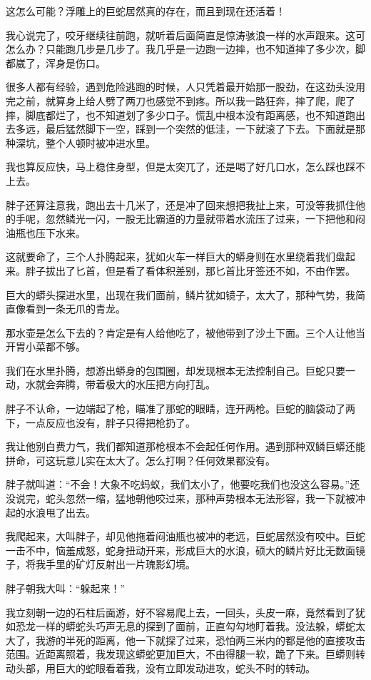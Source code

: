 这怎么可能？浮雕上的巨蛇居然真的存在，而且到现在还活着！

我心说完了，咬牙继续往前跑，就听着后面简直是惊涛骇浪一样的水声跟来。这可怎么办？只能跑几步是几步了。我几乎是一边跑一边摔，也不知道摔了多少次，脚都崴了，浑身是伤口。

很多人都有经验，遇到危险逃跑的时候，人只凭着最开始那一股劲，在这劲头没用完之前，就算身上给人劈了两刀也感觉不到疼。所以我一路狂奔，摔了爬，爬了摔，脚底都烂了，也不知道划了多少口子。慌乱中根本没有距离感，也不知道跑出去多远，最后猛然脚下一空，踩到一个突然的低洼，一下就滚了下去。下面就是那种深坑，整个人顿时被冲进水里。

我也算反应快，马上稳住身型，但是太突兀了，还是喝了好几口水，怎么踩也踩不上去。

胖子还算注意我，跑出去十几米了，还是冲了回来想把我扯上来，可没等我抓住他的手呢，忽然鳞光一闪，一股无比霸道的力量就带着水流压了过来，一下把他和闷油瓶也压下水来。

这就要命了，三个人扑腾起来，犹如火车一样巨大的蟒身则在水里绕着我们盘起来。胖子拔出了匕首，但是看了看体积差别，那匕首比牙签还不如，不由作罢。

巨大的蟒头探进水里，出现在我们面前，鳞片犹如镜子，太大了，那种气势，我简直像看到一条无爪的青龙。

那水壶是怎么下去的？肯定是有人给他吃了，被他带到了沙土下面。三个人让他当开胃小菜都不够。

我们在水里扑腾，想游出蟒身的包围圈，却发现根本无法控制自己。巨蛇只要一动，水就会奔腾，带着极大的水压把方向打乱。

胖子不认命，一边端起了枪，瞄准了那蛇的眼睛，连开两枪。巨蛇的脑袋动了两下，一点反应也没有，胖子只得把枪扔了。

我让他别白费力气，我们都知道那枪根本不会起任何作用。遇到那种双鳞巨蟒还能拼命，可这玩意儿实在太大了。怎么打啊？任何效果都没有。

胖子就叫道：“不会！大象不吃蚂蚁，我们太小了，他要吃我们也没这么容易。”还没说完，蛇头忽然一缩，猛地朝他咬过来，那种声势根本无法形容，我一下就被冲起的水浪甩了出去。

我爬起来，大叫胖子，却见他拖着闷油瓶也被冲的老远，巨蛇居然没有咬中。巨蛇一击不中，恼羞成怒，蛇身扭动开来，形成巨大的水浪，硕大的鳞片好比无数面镜子，将我手里的矿灯反射出一片瑰影幻境。

胖子朝我大叫：“躲起来！”

我立刻朝一边的石柱后面游，好不容易爬上去，一回头，头皮一麻，竟然看到了犹如恐龙一样的蟒蛇头巧声无息的探到了面前，正直勾勾地盯着我。没法躲，蟒蛇太大了，我游的半死的距离，他一下就探了过来，恐怕两三米内的都是他的直接攻击范围。近距离照着，我发现这蟒蛇更加巨大，不由得腿一软，跪了下来。巨蟒则转动头部，用巨大的蛇眼看着我，没有立即发动进攻，蛇头不时的转动。

